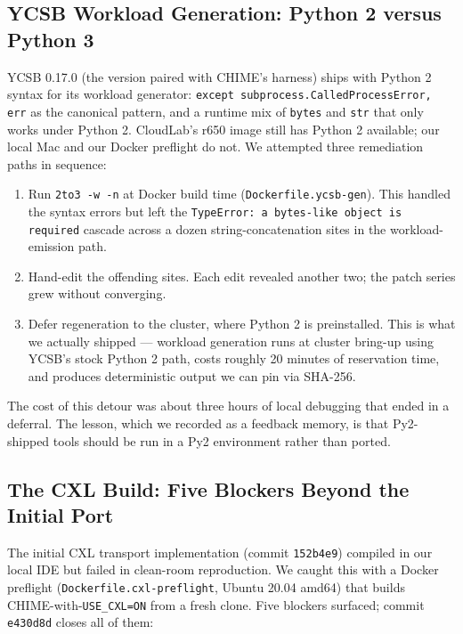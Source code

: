 \documentclass[11pt,a4paper]{article}
\begin{document}
\subsection{YCSB Workload Generation: Python 2 versus Python 3}

YCSB 0.17.0 (the version paired with CHIME's harness) ships with Python 2 syntax for its workload generator: \texttt{except subprocess.CalledProcessError, err} as the canonical pattern, and a runtime mix of \texttt{bytes} and \texttt{str} that only works under Python 2. CloudLab's r650 image still has Python 2 available; our local Mac and our Docker preflight do not. We attempted three remediation paths in sequence:

\begin{enumerate}[nosep]
    \item Run \texttt{2to3 -w -n} at Docker build time (\texttt{Dockerfile.ycsb-gen}). This handled the syntax errors but left the \texttt{TypeError: a bytes-like object is required} cascade across a dozen string-concatenation sites in the workload-emission path.
    \item Hand-edit the offending sites. Each edit revealed another two; the patch series grew without converging.
    \item Defer regeneration to the cluster, where Python 2 is preinstalled. This is what we actually shipped --- workload generation runs at cluster bring-up using YCSB's stock Python 2 path, costs roughly 20 minutes of reservation time, and produces deterministic output we can pin via SHA-256.
\end{enumerate}

The cost of this detour was about three hours of local debugging that ended in a deferral. The lesson, which we recorded as a feedback memory, is that Py2-shipped tools should be run in a Py2 environment rather than ported.

\subsection{The CXL Build: Five Blockers Beyond the Initial Port}
\label{sec:effort-cxl}

The initial CXL transport implementation (commit \texttt{152b4e9}) compiled in our local IDE but failed in clean-room reproduction. We caught this with a Docker preflight (\texttt{Dockerfile.cxl-preflight}, Ubuntu 20.04 amd64) that builds CHIME-with-\texttt{USE\_CXL=ON} from a fresh clone. Five blockers surfaced; commit \texttt{e430d8d} closes all of them:
\end{document}
